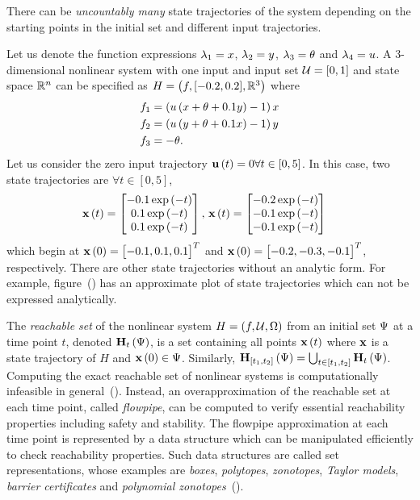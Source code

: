 There can be \emph{uncountably many} state trajectories of the system
depending on the starting points in the initial set and different
input trajectories.
%
\begin{example}\label{eg:ill}
Let us denote the function expressions $\lambda_{1} = x$, $\lambda_{2} = y$,
$\lambda_{3} = \theta$ and $\lambda_{4} = u$.  A $3$-dimensional nonlinear
system with one input and input set $\mathcal{U} = [0,1]$ and state space
$\mathbb{R}^n$ can be specified as $H = \left(f,[-0.2,0.2],\mathbb{R}^3\right)$ where
%
\begin{align*}
& f_1 = \left( u\left( x + \theta + 0.1y \right) - 1\right)x\\
& f_2 = \left( u\left( y + \theta + 0.1x \right) - 1\right)y\\
& f_3 = -\theta.
\end{align*}
%
Let us consider the zero input trajectory $\mathbf{u}\left(t\right) = 0\forall
t\in[0,5]$.  In this case, two state trajectories are $\forall
t\in[0,5]$,
%
\begin{align*}
\mathbf{x}\left(t\right) = \begin{bmatrix} -0.1\exp\left(-t\right)\\ 0.1\exp\left(-t\right)\\ 0.1\exp\left(-t\right) \end{bmatrix},~
& \mathbf{x}\left(t\right) = \begin{bmatrix} -0.2\exp\left(-t\right)\\ -0.1\exp\left(-t\right)\\ -0.1\exp\left(-t\right) \end{bmatrix}
\end{align*}
%
which begin at $\mathbf{x}\left(0\right) = \begin{bmatrix}-0.1,0.1,0.1\end{bmatrix}^T$ and $\mathbf{x}\left(0\right)
= \begin{bmatrix}-0.2,-0.3,-0.1\end{bmatrix}^T$, respectively.
%
There are other state trajectories without an analytic form.  For
example, figure~() has an approximate plot of state
trajectories which can not be expressed analytically.
\end{example}
%
The \emph{reachable set} of the nonlinear system $H
=\left(f,\mathcal{U},\Omega\right)$ from an initial set $\Psi$ at a time point
$t$, denoted $\mathbf{H}_{t}\left(\Psi\right)$, is a set containing all points
$\mathbf{x}\left(t\right)$ where $\mathbf{x}$ is a state trajectory of $H$ and
$\mathbf{x}\left(0\right)\in\Psi$.  Similarly, $\mathbf{H}_{[t_1,t_2]}\left(\Psi\right)
= \bigcup_{t\in[t_1,t_2]}\mathbf{H}_{t}\left(\Psi\right)$.  Computing the exact
reachable set of nonlinear systems is computationally infeasible in
general~().  Instead, an overapproximation of the reachable
set at each time point, called \emph{flowpipe}, can be computed to
verify essential reachability properties including safety and
stability.  The flowpipe approximation at each time point is
represented by a data structure which can be manipulated efficiently
to check reachability properties.  Such data structures are called set
representations, whose examples
are \emph{boxes}, \emph{polytopes}, \emph{zonotopes}, \emph{Taylor
models}, \emph{barrier certificates} and \emph{polynomial
zonotopes}~(). 

